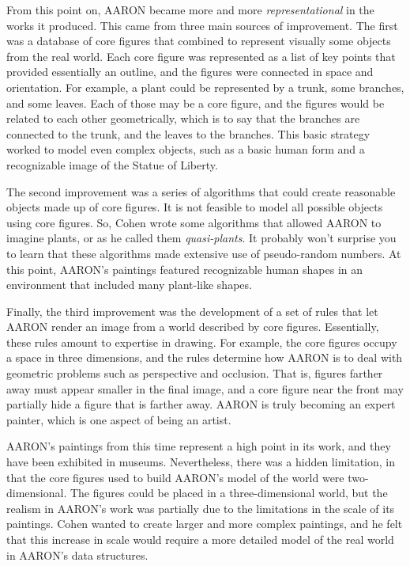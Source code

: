 From this point on, AARON became more and more \emph{representational} in
the works it produced. This came from three main sources of improvement. The first
was a database of core figures that combined to represent visually some
objects from the real world. Each core figure was represented as a list of
key points that provided essentially an outline, and the figures were connected
in space and orientation.
For example, a plant could be represented by
a trunk, some branches, and some leaves. Each of those may be a core figure,
and the figures would be related to each other geometrically, which is to say
that the branches are connected to the trunk, and the leaves to the branches.
This basic strategy worked to model even complex objects, such as a basic human
form and a recognizable image of the Statue of Liberty.

The second improvement was a series of algorithms that could create reasonable
objects made up of core figures. It is not feasible to model all possible
objects using core figures. So, Cohen wrote some algorithms that allowed AARON to
imagine plants,
or as he called them \emph{quasi-plants}. It probably won't surprise
you to learn that these algorithms made extensive use of pseudo-random numbers.
At this point, AARON's paintings featured recognizable human shapes
in an environment that included many plant-like shapes.

Finally, the third improvement was the development of a set of rules that
let AARON render an image from a world described by core figures. Essentially,
these rules amount to expertise in drawing. For example, the core figures occupy
a space in three dimensions, and the rules determine how AARON is to deal with
geometric problems such as perspective and occlusion. That is, figures farther
away must appear smaller in the final image, and a core figure near the front may
partially hide a figure that is farther away. AARON is truly becoming an expert
painter, which is one aspect of being an artist.

AARON's paintings from this time represent a high point in its work, and they
have been exhibited in museums.
Nevertheless, there was a hidden limitation, in that the core figures
used to build AARON's model of the world were two-dimensional. The figures could be
placed in a three-dimensional world, but the realism in AARON's work was partially
due to the limitations in the scale of its paintings. Cohen wanted to create larger
and more complex paintings, and he felt that this increase in scale would require a
more detailed model of the real world in AARON's data structures.

